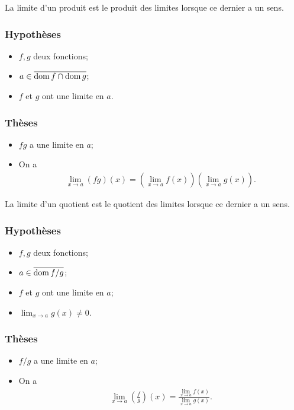 \documentclass[main.tex]{subfiles}
\begin{document}
La limite d'un produit est le produit des limites
lorsque ce dernier a un sens.

\begin{proposition}

    \subsubsection{Hypothèses}
    \begin{itemize}
        \item $f, g$ deux fonctions;
        \item $a \in \overline{\operatorname{dom} f \cap \operatorname{dom} g}$;
        \item $f$ et $g$ ont une limite en $a$.
    \end{itemize}

    \subsubsection{Thèses}
    \begin{itemize}
        \item $f g$ a une limite en $a$;
        \item On a
        \begin{align}
            \lim_{x \to a} (fg)(x) = \left(\lim_{x \to a} f(x)\right) \left(\lim_{x \to a} g(x)\right).
        \end{align}
    \end{itemize}
\end{proposition}

La limite d'un quotient est le quotient des limites
lorsque ce dernier a un sens.

\begin{proposition}

    \subsubsection{Hypothèses}
    \begin{itemize}
        \item $f, g$ deux fonctions;
        \item $a \in \overline{\operatorname{dom} f/g}$;
        \item $f$ et $g$ ont une limite en $a$;
        \item $\lim_{x \to a} g(x) \neq 0$.
    \end{itemize}

    \subsubsection{Thèses}
    \begin{itemize}
        \item $f/g$ a une limite en $a$;
        \item On a
            \begin{align}
                \lim_{x \to a} \left(\frac f g\right)(x) = \frac {\lim_{x \to a} f(x)} {\lim_{x \to a} g(x)}.
            \end{align}
    \end{itemize}
\end{proposition}
\end{document}
